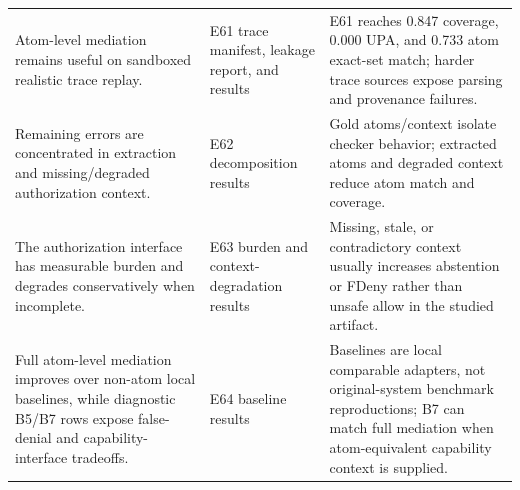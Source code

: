\begin{table}[ht]
\begin{tabularx}{\textwidth}{>{\raggedright\arraybackslash}p{} >{\raggedright\arraybackslash}p{} >{\raggedright\arraybackslash}X}
Atom-level mediation remains useful on sandboxed realistic trace replay. & E61 trace manifest, leakage report, and results & E61 reaches 0.847 coverage, 0.000 UPA, and 0.733 atom exact-set match; harder trace sources expose parsing and provenance failures. \\
Remaining errors are concentrated in extraction and missing/degraded authorization context. & E62 decomposition results & Gold atoms/context isolate checker behavior; extracted atoms and degraded context reduce atom match and coverage. \\
The authorization interface has measurable burden and degrades conservatively when incomplete. & E63 burden and context-degradation results & Missing, stale, or contradictory context usually increases abstention or FDeny rather than unsafe allow in the studied artifact. \\
Full atom-level mediation improves over non-atom local baselines, while diagnostic B5/B7 rows expose false-denial and capability-interface tradeoffs. & E64 baseline results & Baselines are local comparable adapters, not original-system benchmark reproductions; B7 can match full mediation when atom-equivalent capability context is supplied. \\
\bottomrule
\end{tabularx}
\end{table}

